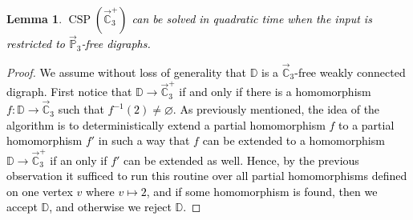 \documentclass{article}
\newtheorem{lemma}[theorem]{Lemma}
\theoremstyle{definition}
\theoremstyle{remark}
\newcommand{\blue}[1]{\textcolor{black}{#1}}
\DeclareMathOperator{\CSP}{CSP}
\newcommand{\bC}{{\mathbb C}}
\newcommand{\bD}{{\mathbb D}}
\newcommand{\bP}{{\mathbb P}}
\begin{document}
\begin{lemma}\label{lem:alg-C3+}
    \blue{$\CSP(\vec{\bC}_3^+)$ can be solved in quadratic time when the input is restricted to $\vec{\bP}_3$-free
    digraphs.}
\end{lemma}
\begin{proof}
    \blue{We assume without loss of generality that $\bD$ is a $\vec{\bC}_3$-free weakly connected digraph.
    First notice that $\bD\to \vec{\bC}_3^+$ if and only if there is a homomorphism $f\colon \bD\to
    \vec{\bC}_3$ such that $f^{-1}(2)\neq \varnothing$. As previously mentioned, the idea of the algorithm
    is to deterministically extend a partial homomorphism $f$ to a partial homomorphism $f'$ in such a way
    that $f$ can be extended to a homomorphism $\bD\to \vec{\bC}_3^+$ if an only if $f'$ can be extended
    as well. Hence, by the previous observation it sufficed to run  this routine over all partial homomorphisms
    defined on one vertex $v$ where $v\mapsto 2$, and if some homomorphism is found, then we accept
    $\bD$, and otherwise we reject $\bD$.}


\end{proof}
\end{document}
